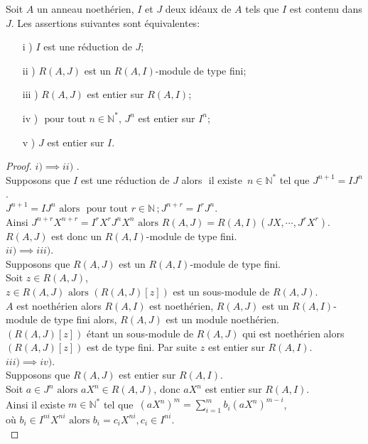 \begin{maproposition}
	Soit $A$ un anneau noethérien, $I$ et $J$ deux idéaux de $A$ tels que $I $ est contenu dans $ J$. Les assertions suivantes sont équivalentes: 
	\begin{enumerate}
		\item[i] ) $I$ est une réduction de $J$;
		\item[ii] ) $R(A,J)$ est un $R(A,I)$-module de type fini;
		\item[iii] ) $R(A,J)$ est entier sur $R(A,I)$;
		\item[iv] ) $\text{ pour tout } n \in \mathbb{N^*}$, $J^n$ est entier sur $I^n$;
		\item[v] ) $J$ est entier sur $I$.
	\end{enumerate}
\end{maproposition}
\begin{proof}
	$i) \implies ii)$ .\\
	Supposons que $I$ est une réduction de $J$ alors $\text{ il existe } \, n \in \mathbb{N}^{*}$ tel que $J^{n+1} = IJ^{n}$.\\
	$J^{n+1} = IJ^{n} \text{ alors } \text{ pour tout } r \in \mathbb{N} \, ; J^{n+r} = I^rJ^{n}$.\\
	Ainsi $J^{n+r} X^{n+r} = I^r X^rJ^{n} X^n \text{ alors } R(A,J) = R(A,I)(JX, \cdots ,J^rX^r)$.\\
	$R(A,J)$ est donc un $R(A,I)$-module de type fini.\\
	$ii) \implies iii)$.\\
	Supposons que $R(A,J)$ est un $R(A,I)$-module de type fini.\\
	Soit $z \in R(A,J)$,\\
	$z \in R(A,J) \text{ alors } (R(A,J)[z])$ est un sous-module de $R(A,J)$.\\
	$A$ est noethérien alors $R(A,I)$ est noethérien, $R(A,J)$ est un $R(A,I)$-module de type fini alors, $R(A,J)$ est un module noethérien.\\
	$(R(A,J)[z])$ étant un sous-module de $R(A,J)$ qui est noethérien alors $(R(A,J)[z])$ est de type fini. Par suite $z$ est entier sur $R(A,I)$.\\
	$iii) \implies iv)$.\\
	Supposons que $R(A,J)$ est entier sur $R(A,I)$.\\
	Soit $a \in J^n \text{ alors } aX^n \in R(A,J)$, donc $aX^n$ est entier sur $R(A,I)$.\\
	Ainsi il existe $m \in \mathbb{N^*}$  tel que  $\, (aX^n)^m = \displaystyle \sum_{i=1}^{m}{b_i (aX^n)^{m-i}}$,\\ où $b_i \in I^{ni} X^{ni} \text{ alors } b_i = c_i X^{ni} , c_i \in I^{ni}$.\\

\end{proof}
